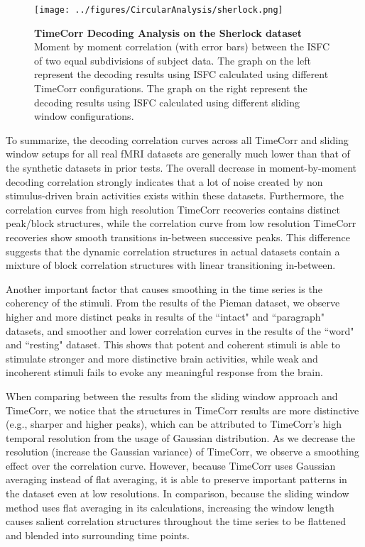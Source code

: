 \documentclass[11pt]{article}
\begin{document}
\begin{figure}[!htb]
\texttt{[image: ../figures/CircularAnalysis/sherlock.png]}
\caption{\textbf{TimeCorr Decoding Analysis on the Sherlock dataset} Moment by moment correlation (with error bars) between the ISFC of two equal subdivisions of subject data. The graph on the left represent the decoding results using ISFC calculated using different TimeCorr configurations. The graph on the right represent the decoding results using ISFC calculated using different sliding window configurations.}
\label{fig:sherlock}
\end{figure}


To summarize, the decoding correlation curves across all TimeCorr and sliding window setups for all real fMRI datasets are generally much lower than that of the synthetic datasets in prior tests. The overall decrease in moment-by-moment decoding correlation strongly indicates that a lot of noise created by non stimulus-driven brain activities exists within these datasets. Furthermore, the correlation curves from high resolution TimeCorr recoveries contains distinct peak/block structures, while the correlation curve from low resolution TimeCorr recoveries show smooth transitions in-between successive peaks. This difference suggests that the dynamic correlation structures in actual datasets contain a mixture of block correlation structures with linear transitioning in-between.

Another important factor that causes smoothing in the time series is the coherency of the stimuli. From the results of the Pieman dataset, we observe higher and more distinct peaks in results of the ``intact" and ``paragraph" datasets, and smoother and lower correlation curves in the results of the  ``word" and ``resting" dataset. This shows that potent and coherent stimuli is able to stimulate stronger and more distinctive brain activities, while weak and incoherent stimuli fails to evoke any meaningful response from the brain.

When comparing between the results from the sliding window approach and TimeCorr, we notice that the structures in TimeCorr results are more distinctive (e.g., sharper and higher peaks), which can be attributed to TimeCorr's high temporal resolution from the usage of Gaussian distribution. As we decrease the resolution (increase the Gaussian variance) of TimeCorr, we observe a smoothing effect over the correlation curve. However, because TimeCorr uses Gaussian averaging instead of flat averaging, it is able to preserve important patterns in the dataset even at low resolutions. In comparison, because the sliding window method uses flat averaging in its calculations, increasing the window length causes salient correlation structures throughout the time series to be flattened and blended into surrounding time points.
\end{document}
